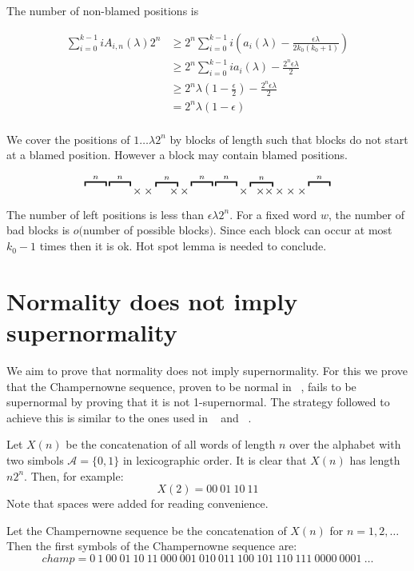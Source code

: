 \documentclass[11pt,a4paper,twoside]{tesis}
\theoremstyle{definition}
\begin{document}
The number of non-blamed positions is


\begin{align*}
    \sum_{i=0}^{k-1} iA_{i,n}(\lambda) 2^n &\geq 2^n\sum_{i=0}^{k-1} i (a_i(\lambda) - \frac{\epsilon\lambda}{2k_0(k_0+1)}) \\
    &\geq 2^n \sum_{i=0}^{k-1} ia_{i}(\lambda) - \frac{2^n\epsilon\lambda}{2} \\
    &\geq 2^n\lambda (1-\frac{\epsilon}{2}) - \frac{2^n\epsilon\lambda}{2} \\
    &= 2^n\lambda(1-\epsilon) \\
\end{align*}

We cover the positions of $1\dots \lambda2^n$ by blocks of length such that blocks do not start at a blamed  position. However a block may contain blamed positions.
 
$$\overbracket{\raisebox{6.4pt}{\qquad}}^{n} \overbracket{\raisebox{6.4pt}{\qquad}}^{n}\times\times\overbracket{\;\quad \times}^{n} \times \overbracket{\raisebox{6.4pt}{\qquad}}^{n} \overbracket{\raisebox{6.4pt}{\qquad}}^{n} \times \overbracket{\;\; \times \times}^{n} \times\times\times \overbracket{\raisebox{6.4pt}{\qquad}}^{n}$$


The number of left positions is less than $\epsilon\lambda2^n$. For a fixed word $w$, the number of bad blocks is $o($number of possible blocks$)$. Since each block can occur at most  $k_0 - 1$ times then it is ok.
Hot spot lemma  is needed to conclude.


\section{Normality does not imply supernormality}
We aim to prove that normality does not imply supernormality. For this we prove that the Champernowne sequence, proven to be normal in ~\cite{BC2018}, fails to be supernormal by proving that it is not 1-supernormal.
The strategy followed to achieve this is similar to the ones used in ~\cite{BCC2019} and  ~\cite{PS2019}.


Let $X(n)$ be the concatenation of all words of length $n$ over the alphabet with two simbols $\mathcal{A}=\{0,1\}$ in lexicographic order.  It is clear that $X(n)$ has length $n2^n$. Then, for example:
$$X(2) = 00 \: 01 \: 10 \: 11$$
Note that spaces were added for reading convenience.

Let the Champernowne sequence be the concatenation of $X(n)$ for $n = 1,2,\dots$ Then the first symbols of the Champernowne sequence are:
$$champ = 0 \: 1 \: 00 \: 01 \: 10 \: 11 \: 000 \: 001 \: 010 \: 011 \: 100 \: 101 \: 110 \: 111 \: 0000 \: 0001 \: \dots$$
\end{document}
